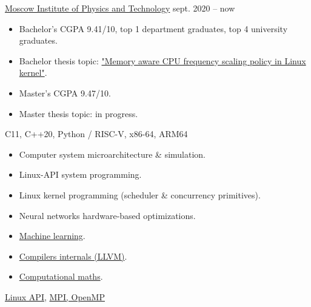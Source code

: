         {\href{https://mipt.ru}{Moscow Institute of Physics and Technology}}
        {sept. 2020 -- now}{}

    \begin{itemize}
        \item Bachelor's CGPA 9.41/10, top 1 department graduates, top 4 university graduates.
        \item Bachelor thesis topic: \href{https://github.com/Vokerlee/macfm-governor-thesis/blob/master/thesis/ru/thesis.pdf}
                   {"Memory aware CPU frequency scaling policy in Linux kernel"}.
        \item Master's CGPA 9.47/10.
        \item Master thesis topic: in progress.
    \end{itemize}

    C11, C++20, Python / RISC-V, x86-64, ARM64
    \smallskip

        \begin{itemize}
            \item Computer system microarchitecture \& simulation.
            \item Linux-API system programming.
        \end{itemize}
    \smallskip

        \begin{itemize}
            \item Linux kernel programming (scheduler \& concurrency primitives).
            \item Neural networks hardware-based optimizations.
        \end{itemize}
    \smallskip

        \begin{itemize}
            \item \href{https://github.com/Vokerlee/machine-learning-mipt}{Machine learning}.
            \item \href{https://github.com/Vokerlee/llvm-practice}{Compilers internals (LLVM)}.
            \item \href{https://github.com/Vokerlee/computational-maths-mipt}{Computational maths}.
        \end{itemize}
    \smallskip

    \href{https://github.com/Vokerlee/linux-api-course}{Linux API},
    \href{https://github.com/Vokerlee/parallel-computing-mipt}{MPI, OpenMP}
    \smallskip

